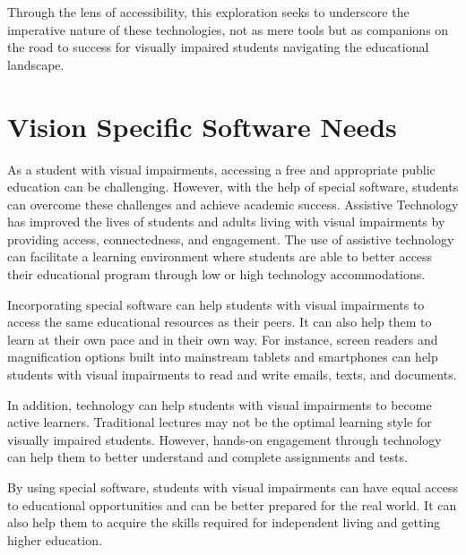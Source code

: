 Through the lens of accessibility, this exploration seeks to underscore the imperative nature of these technologies, not as mere tools but as companions on the road to success for visually impaired students navigating the educational landscape.

\pagebreak \hypertarget{software-needs}{}\section{Vision Specific Software Needs}\label{software-needs}
As a student with visual impairments, accessing a free and appropriate public education can be challenging. However, with the help of special software, students can overcome these challenges and achieve academic success. Assistive Technology has improved the lives of students and adults living with visual impairments by providing access, connectedness, and engagement. The use of assistive technology can facilitate a learning environment where students are able to better access their educational program through low or high technology accommodations.

Incorporating special software can help students with visual impairments to access the same educational resources as their peers. It can also help them to learn at their own pace and in their own way. For instance, screen readers and magnification options built into mainstream tablets and smartphones can help students with visual impairments to read and write emails, texts, and documents.

In addition, technology can help students with visual impairments to become active learners. Traditional lectures may not be the optimal learning style for visually impaired students. However, hands-on engagement through technology can help them to better understand and complete assignments and tests.

By using special software, students with visual impairments can have equal access to educational opportunities and can be better prepared for the real world. It can also help them to acquire the skills required for independent living and getting higher education.

